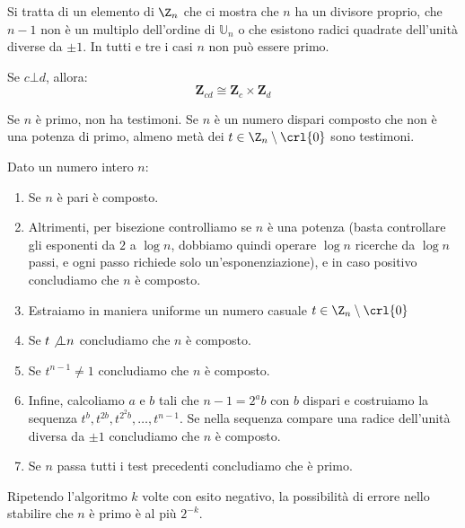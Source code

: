 \documentclass[\main/main.tex]{subfiles}
\begin{document}
\begin{multicols}{2}
\begin{definition}
    Si tratta di un elemento di \(\Z_n\) che ci mostra che \(n\) ha un divisore proprio, che \(n-1\) non è un multiplo dell'ordine di \(\mathbb{U}_n\) o che esistono radici quadrate dell'unità diverse da \(\pm 1\). In tutti e tre i casi \(n\) non può essere primo.
\end{definition}
\vfill\null
\columnbreak
\begin{theorem}
    Se \(c \bot d\), allora:
    \[\mathbf{Z}_{c d} \cong \mathbf{Z}_{c} \times \mathbf{Z}_{d}\]
\end{theorem}
\begin{comment}
\begin{lemma}Es[]
    Sia \(n\) un numero composto dispari che non è potenza di primo, e sia \(m = n-1 = 2^a b\) con \(b\) dispari e \(a>0\). Allora, per almeno la metà degli elementi \(x\) di \(\mathbb{U}_n\) tali che \(x^m=1\), la sequenza:
    \[
        x^{b}, x^{2 b}, x^{2 b}, x^{2^{3} b}, \ldots, x^{2^{a-1} b}, x^{m}=1
    \]
    contiene una radice quadrata dell'unità diversa da \(\pm 1\).
\end{lemma}
\end{comment}
\begin{theorem}
    Se \(n\) è primo, non ha testimoni. Se \(n\) è un numero dispari composto che non è una potenza di primo, almeno metà dei \(t \in \Z_n \setminus \crl{0}\) sono testimoni.
\end{theorem}
\begin{definition}
    Dato un numero intero \(n\):
    \begin{enumerate}
        \item Se \(n\) è pari è composto.
        \item Altrimenti, per bisezione controlliamo se \(n\) è una potenza (basta controllare gli esponenti da \(2\) a \(\log n\), dobbiamo quindi operare \(\log n\) ricerche da \(\log n\) passi, e ogni passo richiede solo un'esponenziazione), e in caso positivo concludiamo che \(n\) è composto.
        \item Estraiamo in maniera uniforme un numero casuale \(t \in \Z_n \setminus \crl{0}\)
        \item Se \(t \not\bot n\) concludiamo che \(n\) è composto.
        \item Se \(t^{n-1} \neq 1\) concludiamo che \(n\) è composto.
        \item Infine, calcoliamo \(a\) e \(b\) tali che \(n-1=2^{a} b\) con \(b\) dispari e costruiamo la sequenza \(t^{b}, t^{2 b}, t^{2^{2} b}, \ldots, t^{n-1}\). Se nella sequenza compare una radice dell'unità diversa da \(\pm 1\) concludiamo che \(n\) è composto.
        \item Se \(n\) passa tutti i test precedenti concludiamo che è primo.
    \end{enumerate}
    Ripetendo l'algoritmo \(k\) volte con esito negativo, la possibilità di errore nello stabilire che \(n\) è primo è al più \(2^{-k}\).
\end{definition}
\end{multicols}
\end{document}

